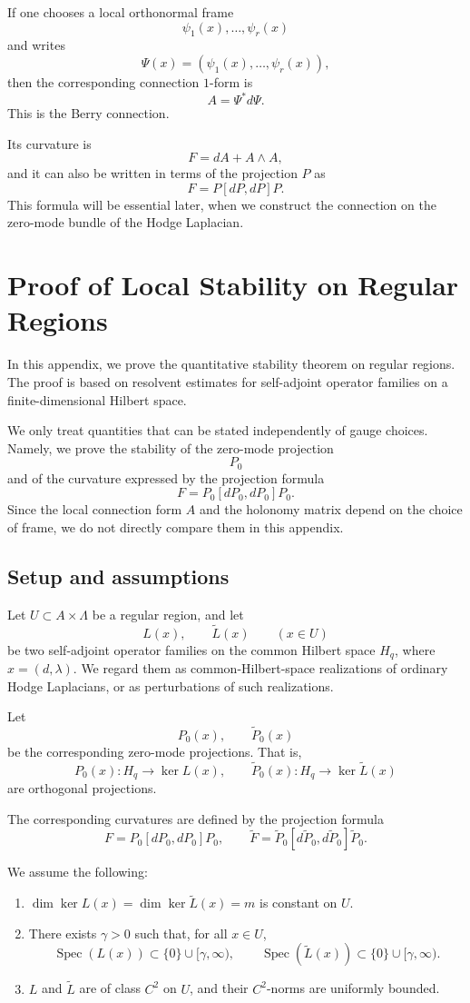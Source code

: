 \documentclass[pdflatex,sn-mathphys-num]{sn-jnl}%
\theoremstyle{thmstyleone}%
\theoremstyle{thmstyletwo}%
\theoremstyle{thmstylethree}%
\begin{document}
\begin{appendices}
If one chooses a local orthonormal frame
\[
\psi_1(x),\dots,\psi_r(x)
\]
and writes
\[
\Psi(x)=(\psi_1(x),\dots,\psi_r(x)),
\]
then the corresponding connection $1$-form is
\[
A=\Psi^\ast d\Psi.
\]
This is the Berry connection.

Its curvature is
\[
F=dA+A\wedge A,
\]
and it can also be written in terms of the projection $P$ as
\[
F=P[dP,dP]P.
\]
This formula will be essential later, when we construct the connection on the zero-mode bundle of the Hodge Laplacian.




\section{Proof of Local Stability on Regular Regions}

In this appendix, we prove the quantitative stability theorem on regular regions. The proof is based on resolvent estimates for self-adjoint operator families on a finite-dimensional Hilbert space.

We only treat quantities that can be stated independently of gauge choices. Namely, we prove the stability of the zero-mode projection
\[
P_0
\]
and of the curvature expressed by the projection formula
\[
F=P_0[dP_0,dP_0]P_0.
\]
Since the local connection form \(A\) and the holonomy matrix depend on the choice of frame, we do not directly compare them in this appendix.

\subsection{Setup and assumptions}

Let \(U\subset A\times\Lambda\) be a regular region, and let
\[
L(x),\qquad \widetilde L(x)
\qquad (x\in U)
\]
be two self-adjoint operator families on the common Hilbert space \(H_q\), where \(x=(d,\lambda)\). We regard them as common-Hilbert-space realizations of ordinary Hodge Laplacians, or as perturbations of such realizations.

Let
\[
P_0(x),\qquad \widetilde P_0(x)
\]
be the corresponding zero-mode projections. That is,
\[
P_0(x):H_q\to \ker L(x),
\qquad
\widetilde P_0(x):H_q\to \ker \widetilde L(x)
\]
are orthogonal projections.

The corresponding curvatures are defined by the projection formula
\[
F=P_0[dP_0,dP_0]P_0,
\qquad
\widetilde F=
\widetilde P_0[d\widetilde P_0,d\widetilde P_0]\widetilde P_0.
\]

We assume the following:
\begin{enumerate}
\item \(\dim\ker L(x)=\dim\ker \widetilde L(x)=m\) is constant on \(U\).
\item There exists \(\gamma>0\) such that, for all \(x\in U\),
\[
\operatorname{Spec}(L(x))\subset\{0\}\cup[\gamma,\infty),
\qquad
\operatorname{Spec}(\widetilde L(x))\subset\{0\}\cup[\gamma,\infty).
\]
\item \(L\) and \(\widetilde L\) are of class \(C^2\) on \(U\), and their \(C^2\)-norms are uniformly bounded.
\end{enumerate}


\end{appendices}
\end{document}
